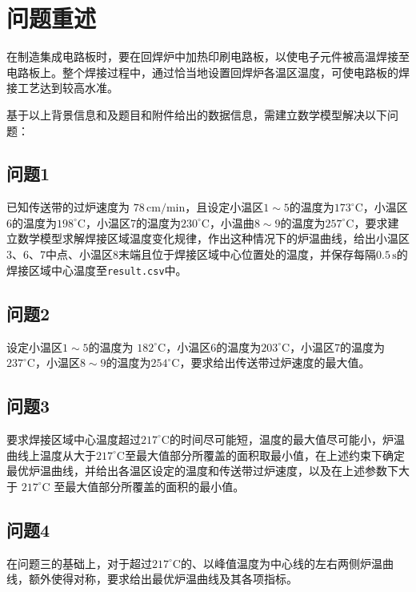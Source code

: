 \section{问题重述}
在制造集成电路板时，要在回焊炉中加热印刷电路板，以使电子元件被高温焊接至电路板上。整个焊接过程中，通过恰当地设置回焊炉各温区温度，可使电路板的焊接工艺达到较高水准。

基于以上背景信息和及题目和附件给出的数据信息，需建立数学模型解决以下问题：

\subsection{问题1}
已知传送带的过炉速度为 \(78\,\mathrm{cm}/\mathrm{min}\)，且设定小温区\(1{\sim} 5\)的温度为\(173 ^{\circ} \mathrm{C}\)，小温区6的温度为\(198^{\circ}\mathrm{C}\)，小温区7的温度为\(230^{\circ}\mathrm{C}\)，小温曲\(8{ \sim }9\)的温度为\(257^{\circ}\mathrm{C}\)，要求建立数学模型求解焊接区域温度变化规律，作出这种情况下的炉温曲线，给出小温区3、6、7中点、小温区8末端且位于焊接区域中心位置处的温度，并保存每隔\(0.5\, \mathrm{s}\)的焊接区域中心温度至\texttt{result.csv}中。

\subsection{问题2}
设定小温区\(1{\sim}5\)的温度为 \(182^{\circ}\mathrm{C}\)，小温区6的温度为\(203^{\circ}\mathrm{C}\)，小温区7的温度为\(237^{\circ}\mathrm{C}\)，小温区\(8{\sim}9\)的温度为\(254^{\circ}\mathrm{C}\)，要求给出传送带过炉速度的最大值。

\subsection{问题3}
要求焊接区域中心温度超过\(217^{\circ}\mathrm{C}\)的时间尽可能短，温度的最大值尽可能小，炉温曲线上温度从大于\(217^{\circ}\mathrm{C}\)至最大值部分所覆盖的面积取最小值，在上述约束下确定最优炉温曲线，并给出各温区设定的温度和传送带过炉速度，以及在上述参数下大于 \(217 ^{\circ}\mathrm{C}\) 至最大值部分所覆盖的面积的最小值。

\subsection{问题4}
在问题三的基础上，对于超过\(217 ^{\circ}\mathrm{C}\)的、以峰值温度为中心线的左右两侧炉温曲线，额外使得对称，要求给出最优炉温曲线及其各项指标。
